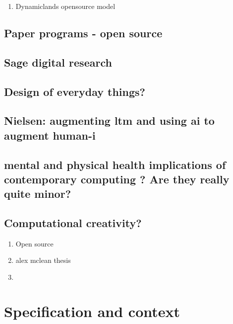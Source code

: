 \documentclass[12pt]{report}
\begin{document}
\begin{enumerate}
\item Dynamiclands opensource model
\label{sec:org99097c1}
\end{enumerate}


\section{Paper programs - open source}
\label{sec:org78aed28}

\section{Sage digital research}
\label{sec:orgafd393b}

\section{Design of everyday things?}
\label{sec:org5393e0f}

\section{Nielsen: augmenting ltm and using ai to augment human-i}
\label{sec:org73e366c}

\section{mental and physical health implications of contemporary computing ? Are they really quite minor?}
\label{sec:org3140d73}

\section{Computational creativity?}
\label{sec:orgd0302ea}

\begin{enumerate}
\item Open source
\label{sec:orgbcac283}

\item alex mclean thesis
\label{sec:org20bb0bc}

\item 
\label{sec:orga808be6}
\end{enumerate}

\chapter{Specification and context}
\label{sec:org46e5fef}
\end{document}
